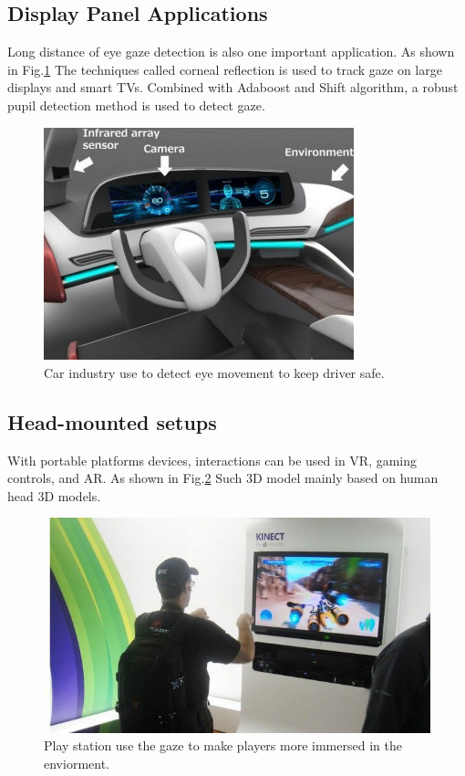 \documentclass[senior]{IPSstyle}
\begin{document}
\subsection{Display Panel Applications}
Long distance of eye gaze detection is also one important application.
As shown in Fig.\ref{fig:car_industry}
The techniques called corneal reflection is used to track gaze on large displays and smart TVs.
Combined with Adaboost and Shift algorithm, a robust pupil detection method is used to detect gaze.\cite{gwon2013robust}

\begin{figure}
    \centering
    \includegraphics[width=9cm]{MasterThesis-master/images/car_industry.jpg}
    \caption{Car industry use to detect eye movement to keep driver safe.}
    \label{fig:car_industry}
\end{figure}

\subsection{Head-mounted setups}
With portable platforms devices, interactions can be used in VR, gaming controls, and AR.
As shown in Fig.\ref{fig:play_station}
Such 3D model mainly based on human head 3D models.
\begin{figure}
    \centering
    \includegraphics[scale=0.4]{MasterThesis-master/images/play_station.jpg}
    \caption{Play station use the gaze to make players more immersed in the enviorment.}
    \label{fig:play_station}
\end{figure}
\end{document}
